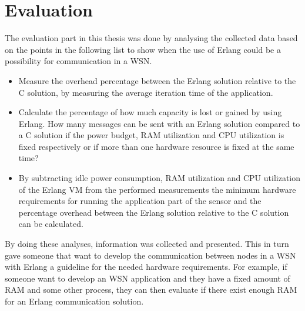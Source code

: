 \section{Evaluation}\label{sec:evaluation}
The evaluation part in this thesis was done by analysing the collected data based on the points in the following list to show when the use of Erlang could be a possibility for communication in a WSN.

\begin{itemize}
    \item Measure the overhead percentage between the Erlang solution relative to the C solution, by measuring the average iteration time of the application. 
    \item Calculate the percentage of how much capacity is lost or gained by using Erlang. How many messages can be sent with an Erlang solution compared to a C solution if the power budget, RAM utilization and CPU utilization is fixed respectively or if more than one hardware resource is fixed at the same time? 
    \item By subtracting idle power consumption, RAM utilization and CPU utilization of the Erlang VM from the performed measurements the minimum hardware requirements for running the application part of the sensor and the percentage overhead between the Erlang solution relative to the C solution can be calculated. 
\end{itemize}

By doing these analyses, information was collected and presented. This in turn gave someone that want to develop the communication between nodes in a WSN with Erlang a guideline for the needed hardware requirements. For example, if someone want to develop an WSN application and they have a fixed amount of RAM and some other process, they can then evaluate if there exist enough RAM for an Erlang communication solution.
